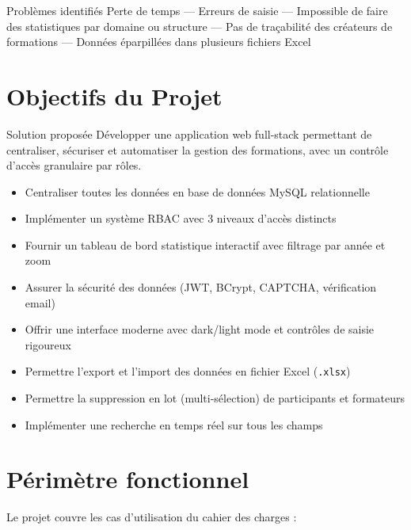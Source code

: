 \documentclass[12pt,a4paper]{report}
\begin{document}
\begin{warnbox}{Probl\`{e}mes identifi\'{e}s}
  Perte de temps --- Erreurs de saisie --- Impossible de faire des statistiques par domaine ou structure --- Pas de tra\c{c}abilit\'{e} des cr\'{e}ateurs de formations --- Donn\'{e}es \'{e}parpill\'{e}es dans plusieurs fichiers Excel
\end{warnbox}

\section{Objectifs du Projet}

\begin{successbox}{Solution propos\'{e}e}
D\'{e}velopper une application web full-stack permettant de centraliser, s\'{e}curiser et automatiser la gestion des formations, avec un contr\^{o}le d'acc\`{e}s granulaire par r\^{o}les.
\end{successbox}

\begin{itemize}
  \item Centraliser toutes les donn\'{e}es en base de donn\'{e}es MySQL relationnelle
  \item Impl\'{e}menter un syst\`{e}me RBAC avec 3 niveaux d'acc\`{e}s distincts
  \item Fournir un tableau de bord statistique interactif avec filtrage par ann\'{e}e et zoom
  \item Assurer la s\'{e}curit\'{e} des donn\'{e}es (JWT, BCrypt, CAPTCHA, v\'{e}rification email)
  \item Offrir une interface moderne avec dark/light mode et contr\^{o}les de saisie rigoureux
  \item Permettre l'export et l'import des donn\'{e}es en fichier Excel (\texttt{.xlsx})
  \item Permettre la suppression en lot (multi-s\'{e}lection) de participants et formateurs
  \item Impl\'{e}menter une recherche en temps r\'{e}el sur tous les champs
\end{itemize}

\section{P\'{e}rim\`{e}tre fonctionnel}

Le projet couvre les cas d'utilisation du cahier des charges \cite{cdc2026} :
\end{document}

